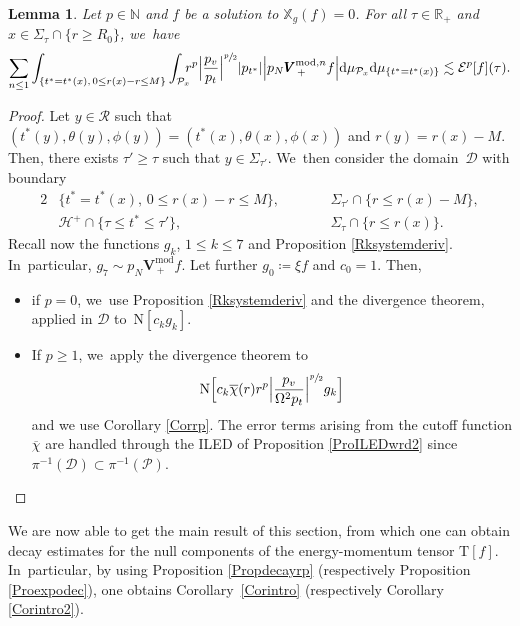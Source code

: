 \documentclass[10pt]{amsart}
\theoremstyle{plain}
\newtheorem{lemma}[proposition]{Lemma}
\theoremstyle{definition}
\newcommand\R{{\mathbb{R}}}
\newcommand\T{{\mathbb{X}}}
\newcommand\dr{{\mathrm{d}}}
\begin{document}
\begin{lemma}\label{LemSobVla}
Let $p \in \mathbb{N}$ and $f$ be a solution to $\T_g(f)=0$. For all $\tau \in \R_+$ and $x \in \Sigma_\tau \cap \{ r \geq R_0 \}$, we~have
\[
\sum_{n \leq 1} \int_{\{ t^*=t^*(x), \, 0\leq r(x)-r \leq M \}} \int_{\mathcal{P}_x}\hspace*{-2mm} r^p\Big|\frac{p_v}{p_t}\Big|^{\sfrac{p}{2}} |p_{t^*}| \Big| p_N \pmb{V}_{\, +}^{ \mathrm{mod},n} f \Big| \dr \mu_{\mathcal{P}_x} \dr \mu_{\{ t^*=t^*(x)\} } \lesssim \mathcal{E}^p[f](\tau).
\]
\end{lemma}
\begin{proof}
Let $y \in \mathcal{R}$ such that $(t^*(y),\theta (y), \phi (y))= (t^* (x), \theta (x), \phi (x))$ and $r(y)=r(x)-M$. Then, there exists $\tau' \geq \tau$ such that $y \in \Sigma_{\tau'}$. We~then consider the domain~$\mathcal{D}$ with boundary
\begin{alignat*}{2}
&\{ t^*=t^*(x), \, 0\leq r(x)-r \leq M \},\qquad &&\Sigma_{\tau'} \cap \{ r \leq r(x)-M \}, \\
&\mathcal{H}^+ \cap \{ \tau \leq t^* \leq \tau' \}, \qquad &&\Sigma_\tau \cap \{ r \leq r(x) \}.
\end{alignat*}
Recall now the functions $g_k$, $1 \leq k \leq 7$ and Proposition \ref{Rksystemderiv}. In~particular, $g_7 \sim p_N \pmb{V}_{\, +}^{ \mathrm{mod}} f$. Let further $g_0 \coloneqq \xi f$ and $c_0=1$. Then,
\begin{itemize}
\item if $p=0$, we~use Proposition \ref{Rksystemderiv} and the divergence theorem, applied in $\mathcal{D}$ to~$\mathrm{N}[c_k g_k]$.
\item If $ p \geq 1$, we~apply the divergence theorem to
\[
\mathrm{N}\Bigl[c_k \overline{\chi} (r) r^p \Big|\frac{p_v}{\Omega^2 p_t} \Big|^{\sfrac{p}{2}} g_k\Bigr]
\]
and we use Corollary \ref{Corrp}. The error terms arising from the cutoff function $\overline{\chi}$ are handled through the ILED of Proposition \ref{ProILEDwrd2} since $\pi^{-1}(\mathcal{D}) \subset \pi^{-1}(\mathcal{P})$.\qedhere
\end{itemize}
\end{proof}

We are now able to get the main result of this section, from which one can obtain decay estimates for the null components of the energy-momentum tensor $\mathrm{T}[f]$. In~particular, by using Proposition \ref{Propdecayrp} (respectively Proposition \ref{Proexpodec}), one obtains Corollary~\ref{Corintro} (respectively Corollary \ref{Corintro2}).
\end{document}
